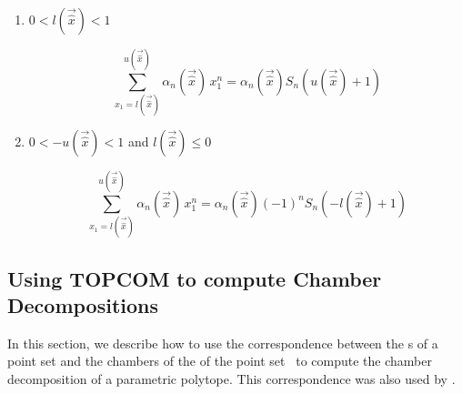 \begin{enumerate}
\setcounter{enumi}{\value{saveenumi}}
\item $0 < l(\vec {\hat x}) < 1$

$$
\sum_{x_1 = l(\vec {\hat x})}^{u(\vec{\hat x})} \alpha_n(\vec{\hat x}) \, x_1^n
=
\alpha_n(\vec{\hat x})
S_n(u(\vec{\hat x})+1)
$$

\item $0 < -u(\vec {\hat x}) < 1$ and $l(\vec {\hat x}) \le 0$

$$
\sum_{x_1 = l(\vec {\hat x})}^{u(\vec{\hat x})} \alpha_n(\vec{\hat x}) \, x_1^n
=
\alpha_n(\vec{\hat x})
(-1)^n
S_n(-l(\vec{\hat x})+1)
$$

\end{enumerate}

\subsection{Using TOPCOM to compute Chamber Decompositions}

In this section, we describe how to use the correspondence
between the s of a point set
and the chambers of the 
of the point set~
to compute the chamber decomposition of a parametric polytope.
This correspondence was also used by 
.

